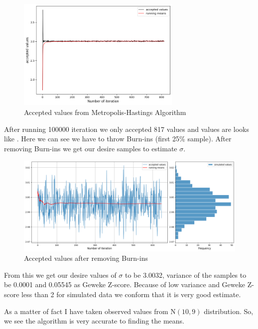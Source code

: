 \begin{example}
	\begin{figure}[H]
		\centering
		\includegraphics[width=0.7\textwidth]{images/metropolis/example2/values.png}
		\caption{Accepted values from Metropolis-Hastings Algorithm}
		\label{fig:example2 values}
	\end{figure}

	After running 100000 iteration we only accepted 817 values and values are looks like . Here we can see we have to throw Burn-ins (first 25\% sample). After removing Burn-ins we get our desire samples to estimate $ \sigma $.

	\begin{figure}[H]
		\centering
		\includegraphics[width=1\textwidth]{images/metropolis/example2/values-after-burnin.png}
		\caption{Accepted values after removing Burn-ins}
	\end{figure}

	From this we get our desire values of $ \sigma $ to be 3.0032, variance of the samples to be 0.0001 and 0.05545 as Geweke Z-score. Because of low variance and Geweke Z-score less than 2 for simulated data we conform that it is very good estimate.

	As a matter of fact I have taken observed values from $ \text{N}(10,9) $ distribution. So, we see the algorithm is very accurate to finding the means.


\end{example}
